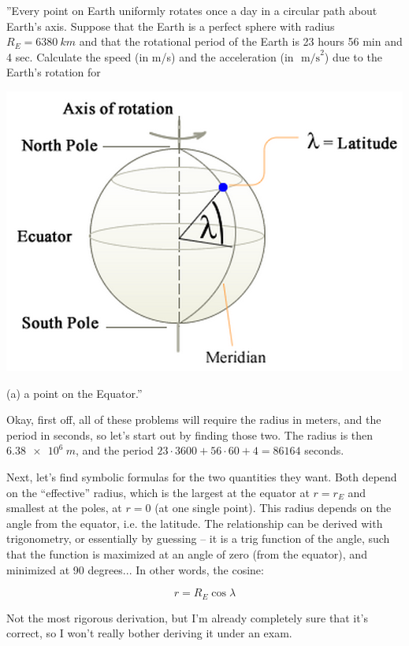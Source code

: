\documentclass[8.01x]{subfiles}
\begin{document}
''Every point on Earth uniformly rotates once a day in a circular path about Earth's axis. Suppose that the Earth is a perfect sphere with radius $R_E = \SI{6380}{km}$ and that the rotational period of the Earth is 23 hours 56 min and 4 sec. Calculate the speed (in m/s) and the acceleration (in $\text{ m/s}^2$) due to the Earth's rotation for

\begin{center}
\includegraphics[scale=0.6]{Graphics/midterm1p2}
\end{center}

(a) a point on the Equator.''

Okay, first off, all of these problems will require the radius in meters, and the period in seconds, so let's start out by finding those two. The radius is then $\SI{6.38e6}{m}$, and the period $23 \cdot 3600 + 56 \cdot 60 + 4 = 86164$ seconds.

Next, let's find symbolic formulas for the two quantities they want. Both depend on the ``effective'' radius, which is the largest at the equator at $r = r_E$ and smallest at the poles, at $r = 0$ (at one single point). This radius depends on the angle from the equator, i.e. the latitude. The relationship can be derived with trigonometry, or essentially by guessing -- it is a trig function of the angle, such that the function is maximized at an angle of zero (from the equator), and minimized at 90 degrees... In other words, the cosine:

\begin{equation}
r = R_E \cos \lambda
\end{equation}

Not the most rigorous derivation, but I'm already completely sure that it's correct, so I won't really bother deriving it under an exam.
\end{document}
